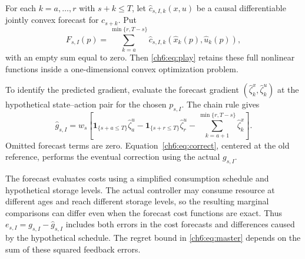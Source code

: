 \documentclass[11pt]{article}
\newcommand{\ind}[1]{\mathbf{1}_{\{#1\}}}
\theoremstyle{plain}
\theoremstyle{remark}
\numberwithin{equation}{section}
\begin{document}
For each $k=a,\ldots,r$ with $s+k\le T$, let
$\widehat c_{s,I,k}(x,u)$ be a causal differentiable jointly convex forecast
for $c_{s+k}$. Put
\begin{equation}\label{ch6:eq:joint-predictor}
 F_{s,I}(p)=
 \sum_{k=a}^{\min\{r,T-s\}}
 \widehat c_{s,I,k}(\widehat x_k(p),\widehat u_k(p)),
\end{equation}
with an empty sum equal to zero. Then \eqref{ch6:eq:play} retains these full
nonlinear functions inside a one-dimensional convex optimization problem.

To identify the predicted gradient, evaluate the forecast gradient
$(\widehat\zeta_k^x,\widehat\zeta_k^u)$ at the hypothetical state--action pair for the chosen
$p_{s,I}$. The chain rule gives
\begin{equation}\label{ch6:eq:predicted-g}
 \widehat g_{s,I}=w_s\left[
 \ind{s+a\le T}\widehat\zeta_a^u
 -\ind{s+r\le T}\widehat\zeta_r^u
 -\sum_{k=a+1}^{\min\{r,T-s\}}\widehat\zeta_k^x
 \right].
\end{equation}
Omitted forecast terms are zero. Equation~\eqref{ch6:eq:correct}, centered at
the old reference, performs the eventual correction using the actual
$g_{s,I}$.

The forecast evaluates costs using a simplified consumption schedule and
hypothetical storage levels. The actual controller may consume resource
at different ages and reach different storage levels, so the resulting
marginal comparisons can differ even when the forecast cost functions
are exact. Thus $e_{s,I}=g_{s,I}-\widehat g_{s,I}$ includes both errors in
the cost forecasts and differences caused by the hypothetical schedule.
The regret bound in \eqref{ch6:eq:master} depends on the sum of these
squared feedback errors.
\end{document}
